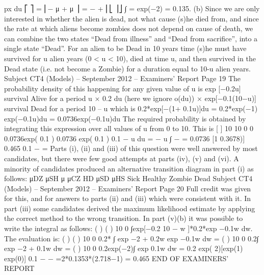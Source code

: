 \documentclass[a4paper,12pt]{article}
\begin{document}
px du
⎡ ⎤
= ⎢− μ + μ ⎥ = − +
⎢⎣ ⎥⎦
∫
= exp(−2) = 0.135.
(b) Since we are only interested in whether the alien is dead, not what cause (s)he
died from,
and since the rate at which aliens become zombies does not depend on cause
of death, we can combine the two states “Dead from illness” and “Dead from
sacrifice”, into a single state “Dead”.
For an alien to be Dead in 10 years time (s)he must have survived for u
alien years (0 < u < 10), died at time u, and then survived in the Dead state (i.e.
not become a Zombie) for a duration equal to 10-u alien years.
Subject CT4 (Models) – September 2012 – Examiners’ Report
Page 19
The probability density of this happening for any given value of u is
exp [−0.2u] survival Alive for a period u
×
0.2 du (here we ignore o(du))
×
exp[−0.1(10−u)] survival Dead for a period 10 – u
which is
0.2*exp[−(1+ 0.1u)]du = 0.2*exp(−1) exp(−0.1u)du
= 0.0736exp(−0.1u)du
The required probability is obtained by integrating this expression over
all values of u from 0 to 10.
This is
[ ]
10
10
0
0
0.0736exp( 0.1 ) 0.0736 exp( 0.1 )
0.1
− u du = − u
∫ −
= 0.0736 [1 0.3678)] 0.465
0.1
− =
Parts (i), (ii) and (iii) of this question were well answered by most candidates, but there were
few good attempts at parts (iv), (v) and (vi). A minority of candidates produced an
alternative transition diagram in part (i) as follows:
μDZ
μSH
μ μCZ HD μSD
μHS
Sick
Healthy
Zombie
Dead
Subject CT4 (Models) – September 2012 – Examiners’ Report
Page 20
Full credit was given for this, and for answers to parts (ii) and (iii) which were consistent
with it. In part (iii) some candidates derived the maximum likelihood estimate by applying
the correct method to the wrong transition. In part (v)(b) it was possible to write the integral
as follows:
( ) ( )
10
0
∫exp[−0.2 10 − w ]*0.2*exp −0.1w dw.
The evaluation is:
( ) ( )
10
0
0.2* ∫ exp −2 + 0.2w exp −0.1w dw
= ( )
10
0
0.2∫ exp −2 + 0.1w dw
= ( )
10
0
0.2exp(−2)∫ exp 0.1w dw
= 0.2 exp( 2)[exp(1) exp(0)]
0.1
− −
=2*0.1353*(2.718−1) = 0.465
END OF EXAMINERS’ REPORT
\end{document}
